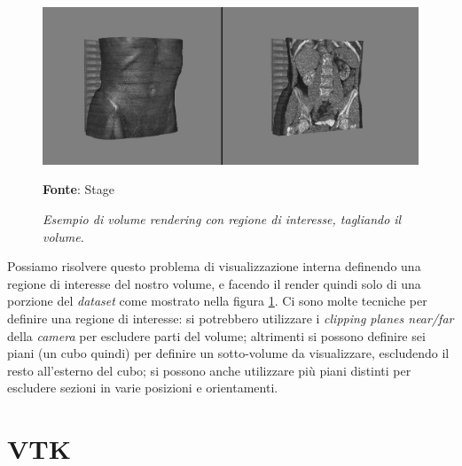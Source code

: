 \begin{figure}[h]
    \centering
    \includegraphics[scale=0.3]{immagini/volumerendering/regionofinterest.png}
    \caption{\textit{Esempio di volume rendering con regione di interesse, tagliando il volume.}}
    \textbf{Fonte}: Stage
    \label{fig: Volume Rendering con Regione di Interesse}
\end{figure}

Possiamo risolvere questo problema di visualizzazione interna definendo una regione di interesse del nostro volume, e facendo il render quindi solo di una porzione del \emph{dataset} come mostrato nella figura \ref{fig: Volume Rendering con Regione di Interesse}. Ci sono molte tecniche per definire una regione di interesse: si potrebbero utilizzare i \emph{clipping planes near/far} della \emph{camera} per escludere parti del volume; altrimenti si possono definire sei piani (un cubo quindi) per definire un sotto-volume da visualizzare, escludendo il resto all'esterno del cubo; si possono anche utilizzare più piani distinti per escludere sezioni in varie posizioni e orientamenti.

\section{VTK}

